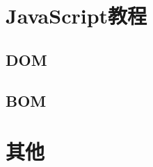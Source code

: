 \documentclass{book}
\begin{document}
\tableofcontents


\part{JavaScript教程}

\chapter{DOM}
\chapter{BOM}
\part{其他}

\end{document}
